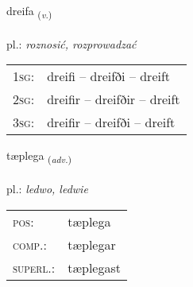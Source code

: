 \documentclass[frontgrid, backgrid]{flacards}\usepackage[]{graphicx}\usepackage[]{xcolor}
\begin{document}
\renewcommand{\flhead}{\vskip5pt \fboxsep=0pt {\small\bfseries\footnotesize Sagnorð | Verb}}
\renewcommand{\fcfoot}{\vskip5pt \fboxsep=0pt \hspace{2pt}{\small\bfseries\footnotesize 2K}}

\renewcommand{\blhead}{\vskip5pt {\small\bfseries\footnotesize Sagnorð | Verb }}
\renewcommand{\bcfoot}{\vskip5pt \hspace{2pt}{\small\bfseries\footnotesize 2K}}


{dreifa \small{\textsubscript{(\textit{v.})}} \\[1ex] %
\textphonetic{[treiːva]} \\
pl.: \emph{roznosić, rozprowadzać} \\  [2ex]
\renewcommand*{\arraystretch}{0.8}
\begin{tabular}{p{1cm}l}
\textsc{1sg}: & dreifi -- dreifði -- dreift \\ 
\textsc{2sg}: & dreifir -- dreifðir -- dreift \\ 
\textsc{3sg}: & dreifir -- dreifði -- dreift \\ 
\end{tabular}
}

\renewcommand{\flhead}{\vskip5pt \fboxsep=0pt {\small\bfseries\footnotesize Atviksorð | Adverb}}
\renewcommand{\fcfoot}{\vskip5pt \fboxsep=0pt \hspace{2pt}{\small\bfseries\footnotesize 2K}}

\renewcommand{\blhead}{\vskip5pt {\small\bfseries\footnotesize Atviksorð | Adverb }}
\renewcommand{\bcfoot}{\vskip5pt \hspace{2pt}{\small\bfseries\footnotesize 2K}}


{tæplega \small{\textsubscript{(\textit{adv.})}} \\[1ex] %
\textphonetic{[tʰaiplɛɣa]} \\
pl.: \emph{ledwo, ledwie} \\  [2ex]
\renewcommand*{\arraystretch}{0.8}
\begin{tabular}{ll}
\textsc{pos}: & tæplega \\ 
\textsc{comp.}: & tæplegar \\ 
\textsc{superl.}: & tæplegast \\
\end{tabular}
}
\end{document}
